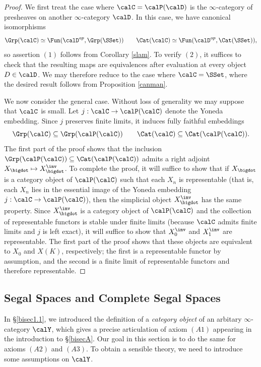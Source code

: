\begin{proof}
We first treat the case where $\calC = \calP(\calD)$ is the $\infty$-category of presheaves on
another $\infty$-category $\calD$. In this case, we have canonical isomorphisms
$$ \Grp(\calC) \simeq \Fun( \calD^{op}, \Grp(\SSet) ) \quad \quad \Cat(\calC) \simeq \Fun( \calD^{op}, \Cat(\SSet)),$$
so assertion $(1)$ follows from Corollary \ref{slam}. To verify $(2)$, it suffices to check that the resulting maps are equivalences after evaluation at every object $D \in \calD$. We may therefore reduce to the case where $\calC = \SSet$, where the desired result follows from Proposition \ref{canman}.

We now consider the general case. Without loss of generality we may suppose that $\calC$ is small.
Let $j: \calC \rightarrow \calP(\calC)$ denote the Yoneda embedding. Since $j$ preserves finite limits, it induces fully faithful embeddings
$$ \Grp(\calC) \subseteq \Grp( \calP(\calC) ) \quad \quad \Cat(\calC) \subseteq \Cat( \calP(\calC) ).$$
The first part of the proof shows that the inclusion $\Grp( \calP(\calC) ) \subseteq \Cat( \calP(\calC) )$ admits a right adjoint $X_{\bigdot} \mapsto X_{\bigdot}^{\inv}$. To complete the proof, it will suffice
to show that if $X_{\bigdot}$ is a category object of $\calP(\calC)$ such that each
$X_{n}$ is representable (that is, each $X_n$ lies in the essential image of the Yoneda embedding
$j: \calC \rightarrow \calP(\calC)$), then the simplicial object $X_{\bigdot}^{\inv}$ has the same property.
Since $X_{\bigdot}^{\inv}$ is a category object of $\calP(\calC)$ and the collection of representable functors is stable under finite limits (because $\calC$ admits finite limits and $j$ is left exact), 
it will suffice to show that $X_0^{\inv}$ and $X_1^{\inv}$ are representable. The first part of the proof shows that these objects are equivalent to $X_0$ and $X(K)$, respectively; the first is a representable functor by assumption, and the second is a finite limit of representable functors and therefore representable.
\end{proof}


\subsection{Segal Spaces and Complete Segal Spaces}\label{bisec1.2}

In \S \ref{bisec1.1}, we introduced the definition of a {\it category object} of an
arbitary $\infty$-category $\calY$, which gives a precise articulation of
axiom $(A1)$ appearing in the introduction to \S \ref{bisecA}. Our goal in this
section is to do the same for axioms $(A2)$ and $(A3)$. To obtain a sensible theory, we need to introduce some assumptions on $\calY$.

